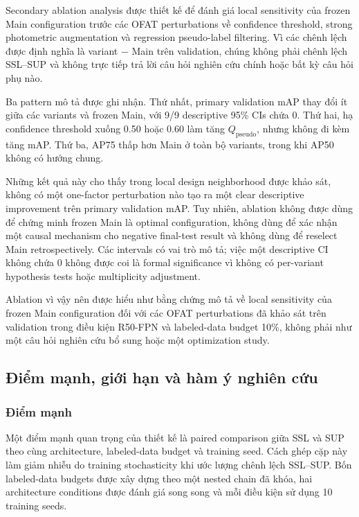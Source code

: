 \documentclass[pdflatex,sn-mathphys-num]{sn-jnl}%
\theoremstyle{thmstyleone}%
\theoremstyle{thmstyletwo}%
\theoremstyle{thmstylethree}%
\begin{document}
Secondary ablation analysis được thiết kế để đánh giá local sensitivity của frozen Main configuration trước các OFAT perturbations về confidence threshold, strong photometric augmentation và regression pseudo-label filtering. Vì các chênh lệch được định nghĩa là variant $-$ Main trên validation, chúng không phải chênh lệch SSL--SUP và không trực tiếp trả lời câu hỏi nghiên cứu chính hoặc bất kỳ câu hỏi phụ nào.

Ba pattern mô tả được ghi nhận. Thứ nhất, primary validation mAP thay đổi ít giữa các variants và frozen Main, với 9/9 descriptive 95\% CIs chứa 0. Thứ hai, hạ confidence threshold xuống 0.50 hoặc 0.60 làm tăng $Q_{\mathrm{pseudo}}$, nhưng không đi kèm tăng mAP. Thứ ba, AP75 thấp hơn Main ở toàn bộ variants, trong khi AP50 không có hướng chung.

Những kết quả này cho thấy trong local design neighborhood được khảo sát, không có một one-factor perturbation nào tạo ra một clear descriptive improvement trên primary validation mAP. Tuy nhiên, ablation không được dùng để chứng minh frozen Main là optimal configuration, không dùng để xác nhận một causal mechanism cho negative final-test result và không dùng để reselect Main retrospectively. Các intervals có vai trò mô tả; việc một descriptive CI không chứa 0 không được coi là formal significance vì không có per-variant hypothesis tests hoặc multiplicity adjustment.

Ablation vì vậy nên được hiểu như bằng chứng mô tả về local sensitivity của
frozen Main configuration đối với các OFAT perturbations đã khảo sát trên
validation trong điều kiện R50-FPN và labeled-data budget 10\%, không phải
như một câu hỏi nghiên cứu bổ sung hoặc một optimization study.

\subsection{Điểm mạnh, giới hạn và hàm ý nghiên cứu}

\subsubsection{Điểm mạnh}

Một điểm mạnh quan trọng của thiết kế là paired comparison giữa SSL và SUP theo cùng architecture, labeled-data budget và training seed. Cách ghép cặp này làm giảm nhiễu do training stochasticity khi ước lượng chênh lệch SSL--SUP. Bốn labeled-data budgets được xây dựng theo một nested chain đã khóa, hai architecture conditions được đánh giá song song và mỗi điều kiện sử dụng 10 training seeds.
\end{document}
